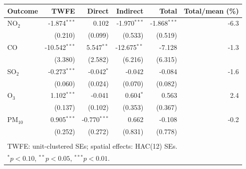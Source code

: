 \begin{tabular}{lrrrrr}
\toprule
Outcome & TWFE & Direct & Indirect & Total & Total/mean (\%) \\
\midrule
NO$_2$ & -1.874$^{***}$ & 0.102 & -1.970$^{***}$ & -1.868$^{***}$ & -6.3 \\
 & (0.210) & (0.099) & (0.533) & (0.519) &  \\
\addlinespace[3pt]
CO & -10.542$^{***}$ & 5.547$^{**}$ & -12.675$^{**}$ & -7.128 & -1.3 \\
 & (3.380) & (2.582) & (6.216) & (6.315) &  \\
\addlinespace[3pt]
SO$_2$ & -0.273$^{***}$ & -0.042$^{*}$ & -0.042 & -0.084 & -1.6 \\
 & (0.060) & (0.024) & (0.070) & (0.082) &  \\
\addlinespace[3pt]
O$_3$ & 1.102$^{***}$ & -0.041 & 0.604$^{*}$ & 0.563 & 2.4 \\
 & (0.137) & (0.102) & (0.353) & (0.367) &  \\
\addlinespace[3pt]
PM$_{10}$ & 0.905$^{***}$ & -0.770$^{***}$ & 0.662 & -0.108 & -0.2 \\
 & (0.252) & (0.272) & (0.831) & (0.778) &  \\
\addlinespace[3pt]
\bottomrule
\multicolumn{6}{l}{\footnotesize Standard errors in parentheses.} \\
\multicolumn{6}{l}{\footnotesize TWFE: unit-clustered SEs; spatial effects: HAC(12) SEs.} \\
\multicolumn{6}{l}{\footnotesize $^{*}p<0.10$, $^{**}p<0.05$, $^{***}p<0.01$.} \\
\end{tabular}
